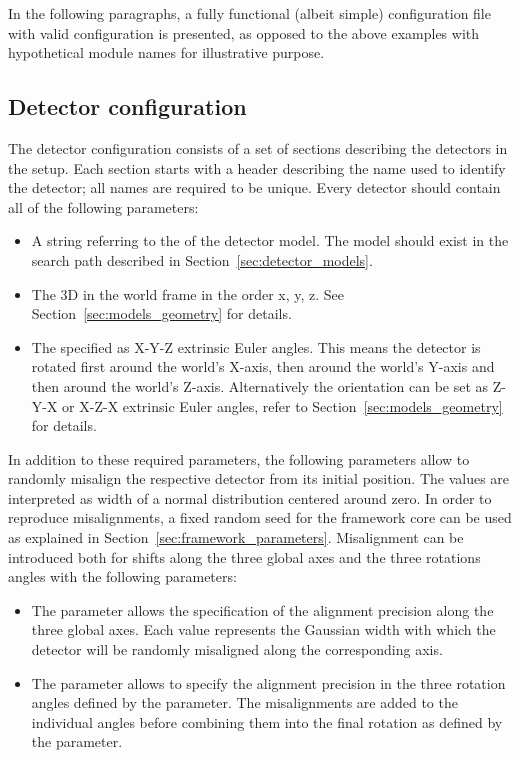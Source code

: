 In the following paragraphs, a fully functional (albeit simple) configuration file with valid configuration is presented, as opposed to the above examples with hypothetical module names for illustrative purpose.

\subsection{Detector configuration}
\label{sec:detector_config}
The detector configuration consists of a set of sections describing the detectors in the setup.
Each section starts with a header describing the name used to identify the detector; all names are required to be unique.
Every detector should contain all of the following parameters:
\begin{itemize}
\item A string referring to the  of the detector model.
The model should exist in the search path described in Section~\ref{sec:detector_models}.
\item The 3D  in the world frame in the order x, y, z.
See Section~\ref{sec:models_geometry} for details.
\item The  specified as X-Y-Z extrinsic Euler angles.
This means the detector is rotated first around the world's X-axis, then around the world's Y-axis and then around the world's Z-axis.
Alternatively the orientation can be set as Z-Y-X or X-Z-X extrinsic Euler angles, refer to Section~\ref{sec:models_geometry} for details.
\end{itemize}

In addition to these required parameters, the following parameters allow to randomly misalign the respective detector from its initial position. The values are interpreted as width of a normal distribution centered around zero.
In order to reproduce misalignments, a fixed random seed for the framework core can be used as explained in Section~\ref{sec:framework_parameters}.
Misalignment can be introduced both for shifts along the three global axes and the three rotations angles with the following parameters:
\begin{itemize}
\item The parameter  allows the specification of the alignment precision along the three global axes. Each value represents the Gaussian width with which the detector will be randomly misaligned along the corresponding axis.
\item The parameter  allows to specify the alignment precision in the three rotation angles defined by the  parameter. The misalignments are added to the individual angles before combining them into the final rotation as defined by the  parameter.
\end{itemize}

